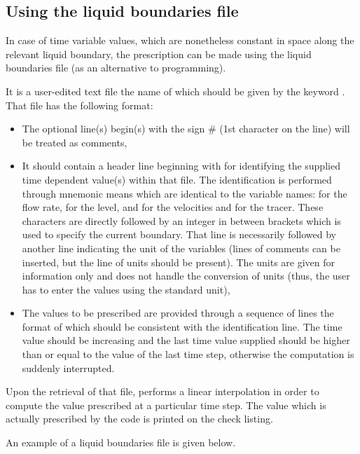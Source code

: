 \subsection{Using the liquid boundaries file}
\label{sec:liqbnd}
In case of time variable values, which are nonetheless constant in space along
the relevant liquid boundary, the prescription can be made using the liquid
boundaries file (as an alternative to programming).

It is a user-edited text file the name of which should be given by the keyword
. That file has the
following format:

\begin{itemize}
\item The optional line(s) begin(s) with the sign $\#$ (1st character on the
line) will be treated as comments,

\item It should contain a header line beginning with  for identifying
the supplied time dependent value(s) within that file. The identification is
performed through mnemonic means which are identical to the variable names:
 for the flow rate,  for the level,  and
 for the velocities and  for the
tracer. These characters are directly followed by an integer in between
brackets which is used to specify the current boundary. That line is
necessarily followed by another line indicating the unit of the variables
(lines of comments can be inserted, but the line of units should be present).
The units are given for information only and  does not handle the
conversion of units (thus, the user has to enter the values using the standard
unit),

\item The values to be prescribed are provided through a sequence of lines the
format of which should be consistent with the identification line. The time
value should be increasing and the last time value supplied should be higher
than or equal to the value of the last time step, otherwise the computation is
suddenly interrupted.
\end{itemize}

Upon the retrieval of that file,  performs a linear interpolation in
order to compute the value prescribed at a particular time step. The value
which is actually prescribed by the code is printed on the check listing.

An example of a liquid boundaries file is given below.

